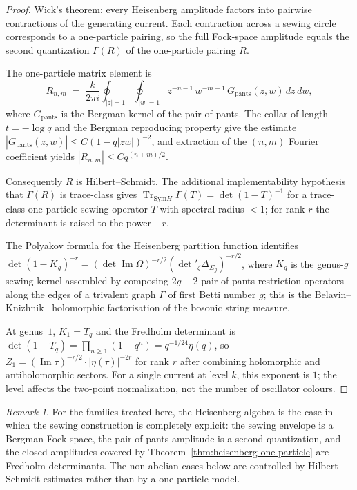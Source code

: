 \documentclass[11pt,reqno]{amsart}
\theoremstyle{definition}
\theoremstyle{remark}
\newtheorem{remark}[theorem]{Remark}
\newcommand{\Sym}{\mathrm{Sym}}
\numberwithin{equation}{section}
\begin{document}
\begin{proof}
Wick's theorem: every Heisenberg amplitude factors into
pairwise contractions of the generating current. Each
contraction across a sewing circle corresponds to a
one-particle pairing, so the full Fock-space amplitude
equals the second quantization $\Gamma(R)$ of the
one-particle pairing $R$.

The one-particle matrix element is
\[
R_{n,m}
\;=\;
\frac{k}{2\pi i}\oint_{|z| = 1}
\oint_{|w| = 1}
z^{-n-1}\, w^{-m-1}\, G_{\mathrm{pants}}(z, w)\, dz\, dw,
\]
where $G_{\mathrm{pants}}$ is the Bergman kernel of the pair
of pants. The collar of length $t = -\log q$ and the Bergman
reproducing property give the estimate
$|G_{\mathrm{pants}}(z, w)| \leq C (1 - q|zw|)^{-2}$,
and extraction of the $(n, m)$ Fourier coefficient yields
$|R_{n,m}| \leq C q^{(n+m)/2}$.

Consequently $R$ is Hilbert--Schmidt. The additional
implementability hypothesis that $\Gamma(R)$ is trace-class gives
$\operatorname{Tr}_{\Sym H}\Gamma(T)=\det(1-T)^{-1}$ for a
trace-class one-particle sewing operator $T$ with spectral radius
$<1$; for rank $r$ the determinant is raised to the power $-r$.

The Polyakov formula for the Heisenberg partition function
identifies
$\det(1 - K_g)^{-r}
= (\det\operatorname{Im}\Omega)^{-r/2}
(\det{}'_\zeta \Delta_{\Sigma_g})^{-r/2}$,
where $K_g$ is the genus-$g$ sewing kernel assembled by
composing $2g - 2$ pair-of-pants restriction operators along
the edges of a trivalent graph $\Gamma$ of first Betti number
$g$; this is the Belavin--Knizhnik~\cite{BK86} holomorphic
factorisation of the bosonic string measure.

At genus~$1$, $K_1 = T_q$ and the Fredholm determinant is
$\det(1 - T_q) = \prod_{n \geq 1}(1 - q^n) = q^{-1/24}\eta(q)$,
so $Z_1 = (\operatorname{Im}\tau)^{-r/2}\cdot |\eta(\tau)|^{-2r}$
for rank $r$ after combining holomorphic and antiholomorphic
sectors. For a single current at level $k$, this exponent is $1$;
the level affects the two-point normalization, not the number of
oscillator colours.
\end{proof}

\begin{remark}
For the families treated here, the Heisenberg algebra is the case in
which the sewing construction is completely explicit: the sewing
envelope is a Bergman Fock space, the pair-of-pants amplitude is a
second quantization, and the closed amplitudes covered by
Theorem~\ref{thm:heisenberg-one-particle} are Fredholm
determinants. The non-abelian cases below are controlled by
Hilbert--Schmidt estimates rather than by a one-particle model.
\end{remark}
\end{document}

